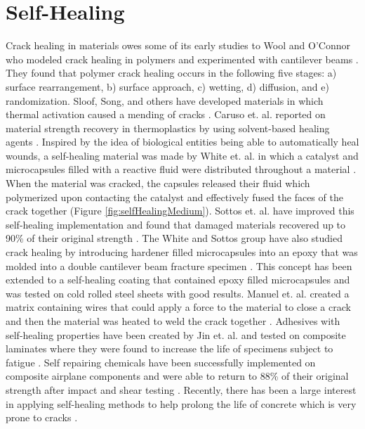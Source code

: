 \section{Self-Healing}

Crack healing in materials owes some of its early studies to Wool and O'Connor who modeled crack healing in polymers and experimented with cantilever beams \cite{Wool1981, Wool1982}. They found that polymer crack healing occurs in the following five stages: a) surface rearrangement, b) surface approach, c) wetting, d) diffusion, and e) randomization. Sloof, Song, and others have developed materials in which thermal activation caused a mending of cracks \cite{Song2009, Sloof2009, Bosman2009, Djugum2009, Luo2009}. Caruso et. al. reported on material strength recovery in thermoplastics by using solvent-based healing agents \cite{Caruso2009}. Inspired by the idea of biological entities being able to automatically heal wounds, a self-healing material was made by White et. al. in which a catalyst and microcapsules filled with a reactive fluid were distributed throughout a material \cite{White2001}. When the material was cracked, the capsules released their fluid which polymerized upon contacting the catalyst and effectively fused the faces of the crack together (Figure \ref{fig:selfHealingMedium}). Sottos et. al. have improved this self-healing implementation and found that damaged materials recovered up to 90\% of their original strength \cite{Sottos2009}. The White and Sottos group have also studied crack healing by introducing hardener filled microcapsules into an epoxy that was molded into a double cantilever beam fracture specimen \cite{Mcllroy2009}. This concept has been extended to a self-healing coating that contained epoxy filled microcapsules and was tested on cold rolled steel sheets with good results\cite{Zhao2012}. Manuel et. al. created a matrix containing wires that could apply a force to the material to close a crack and then the material was heated to weld the crack together \cite{Manuel2009}. Adhesives with self-healing properties have been created by Jin et. al. and tested on composite laminates where they were found to increase the life of specimens subject to fatigue \cite{Jin2009}. Self repairing chemicals have been successfully implemented on composite airplane components and were able to return to 88\% of their original strength after impact and shear testing \cite{Dry2009}. Recently, there has been a large interest in applying self-healing methods to help prolong the life of concrete which is very prone to cracks \cite{Wu2012}. 

